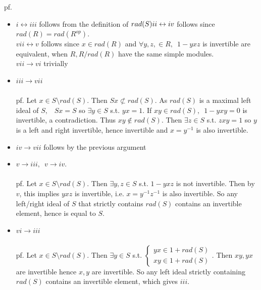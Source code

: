 \documentclass[12pt,letterpaper]{report}
\begin{document}
pf. \begin{itemize}
\item $i\leftrightarrow iii$ follows from the definition of $rad(S) 
\\ii\leftrightarrow iv$ follows since $rad(R)=rad(R^{op})$. 
\\$vii\leftrightarrow v$ follows since $x\in rad(R)$ and $\forall y,z,\in R,\,\,\,1-yxz$ is invertible are equivalent, when $R,R/rad(R)$ have the same simple modules. 
\\$vii\rightarrow vi$ trivially
\item $iii\rightarrow vii$
\\\\pf. Let $x\in S\setminus rad(S)$. Then $Sx\not\subset rad(S)$. As $rad(S)$ is a maximal left ideal of $S,\,\,\,\,\,Sx=S$ so $\exists y\in S$ s.t. $yx=1$. If $xy\in rad(S),\,\,\,1-yxy=0$ is invertible, a contradiction. Thus $xy\notin rad(S)$. Then $\exists z\in S$ s.t. $zxy=1$ so $y$ is a left and right invertible, hence invertible and $x=y^{-1}$ is also invertible.
\item $iv\rightarrow vii$ follows by the previous argument
\item $v\rightarrow iii,\,\,\,v\rightarrow iv$.
\\\\pf. Let $x\in S\setminus rad(S)$. Then $\exists y,z\in S$ s.t. $1-yxz$ is not invertible. Then by $v$, this implies $yxz$ is invertible, i.e. $x=y^{-1}z^{-1}$ is also invertible. So any left/right ideal of $S$ that strictly contains $rad(S)$ contains an invertible element, hence is equal to $S$.
\item $vi\rightarrow iii$
\\\\pf. Let $x\in S\setminus rad(S)$. Then $\exists y\in S$ s.t. $\left\{\begin{array}{r}yx\in 1+rad(S)\\xy\in 1+rad(S)\end{array}\right.$. Then $xy,yx$ are invertible hence $x,y$ are invertible. So any left ideal strictly containing $rad(S)$ contains an invertible element, which gives $iii$.

\end{itemize}
\end{document}
